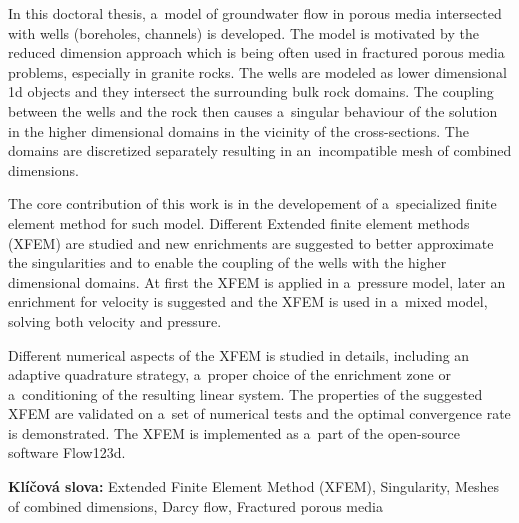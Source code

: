 \documentclass[bibliography=totocnumbered,dvipsnames,FM,Dis]{tulthesis}
\begin{document}
\begin{abstractEN}
In this doctoral thesis, a~model of groundwater flow in porous media intersected with wells (boreholes, channels) is developed.
The model is motivated by the reduced dimension approach which is being often used in fractured porous media problems, especially in granite rocks.
The wells are modeled as lower dimensional 1d objects and they intersect the surrounding bulk rock domains.
The coupling between the wells and the rock then causes a~singular behaviour of the solution in the higher dimensional domains
in the vicinity of the cross-sections. The domains are discretized separately resulting in an~incompatible mesh of combined dimensions.

The core contribution of this work is in the developement of a~specialized finite element method for such model.
Different Extended finite element methods (XFEM) are studied and new enrichments are suggested to better
approximate the singularities and to enable the coupling of the wells with the higher dimensional domains.
At first the XFEM is applied in a~pressure model, later an enrichment for velocity
is suggested and the XFEM is used in a~mixed model, solving both velocity and pressure.

Different numerical aspects of the XFEM is studied in details, including an adaptive quadrature strategy,
a~proper choice of the enrichment zone or a~conditioning of the resulting linear system.
The properties of the suggested XFEM are validated on a~set of numerical tests and the optimal convergence
rate is demonstrated. The XFEM is implemented as a~part of the open-source software Flow123d.

\vspace{1cm}
\textbf{Klíčová slova: } Extended Finite Element Method (XFEM), Singularity, Meshes of combined dimensions,
                         Darcy flow, Fractured porous media
                         

\end{abstractEN}

\clearpage

\end{document}
